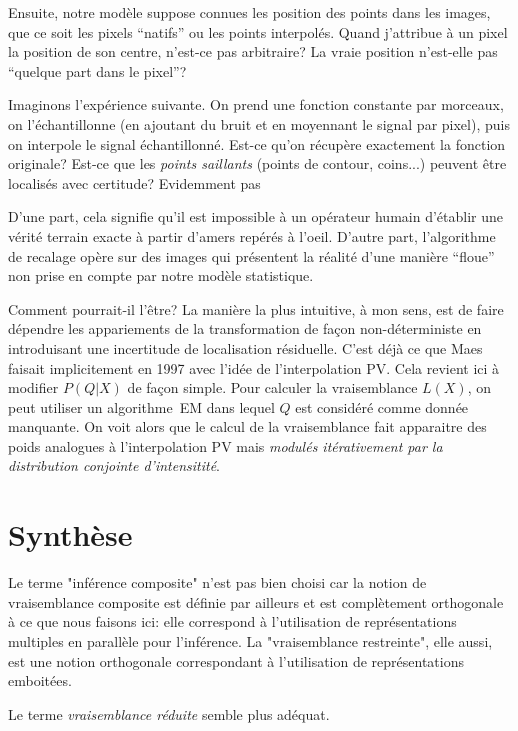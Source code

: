 \documentclass{article}
\begin{document}
Ensuite, notre mod\`ele suppose connues les position des points dans les images, que ce soit les pixels ``natifs'' ou les points interpol\'es. Quand j'attribue \`a un pixel la position de son centre, n'est-ce pas arbitraire? La vraie position n'est-elle pas ``quelque part dans le pixel''? 

Imaginons l'exp\'erience suivante. On prend une fonction constante par morceaux, on l'\'echantillonne (en ajoutant du bruit et en moyennant le signal par pixel), puis on interpole le signal \'echantillonn\'e. Est-ce qu'on r\'ecup\`ere exactement la fonction originale? Est-ce que les {\em points saillants} (points de contour, coins...) peuvent \^etre localis\'es avec certitude? Evidemment pas

D'une part, cela signifie qu'il est impossible \`a un op\'erateur humain d'\'etablir une v\'erit\'e terrain exacte \`a partir d'amers rep\'er\'es \`a l'oeil. D'autre part, l'algorithme de recalage op\`ere sur des images qui pr\'esentent la r\'ealit\'e d'une mani\`ere ``floue'' non prise en compte par notre mod\`ele statistique.

Comment pourrait-il l'\^etre? La mani\`ere la plus intuitive, \`a mon sens, est de faire d\'ependre les appariements de la transformation de fa\c con non-d\'eterministe en introduisant une incertitude de localisation r\'esiduelle. C'est d\'ej\`a ce que Maes faisait implicitement en 1997 avec l'id\'ee de l'interpolation PV. Cela revient ici \`a modifier $P(Q|X)$ de fa\c{c}on simple. Pour calculer la vraisemblance $L(X)$, on peut utiliser un algorithme~EM dans lequel $Q$ est consid\'er\'e comme donn\'ee manquante. On voit alors que le calcul de la vraisemblance fait apparaitre des poids analogues \`a l'interpolation PV mais {\em modul\'es it\'erativement par la distribution conjointe d'intensitit\'e}.


\section{Synth\`ese}

Le terme "inférence composite" n'est pas bien choisi car la notion de vraisemblance composite est d\'efinie par ailleurs et est compl\`etement orthogonale \`a ce que nous faisons ici: elle correspond \`a l'utilisation de repr\'esentations multiples en parall\`ele pour l'inf\'erence. La "vraisemblance restreinte", elle aussi, est une notion orthogonale correspondant \`a l'utilisation de repr\'esentations emboit\'ees.

Le terme {\em vraisemblance r\'eduite} semble plus ad\'equat.  
\end{document}
